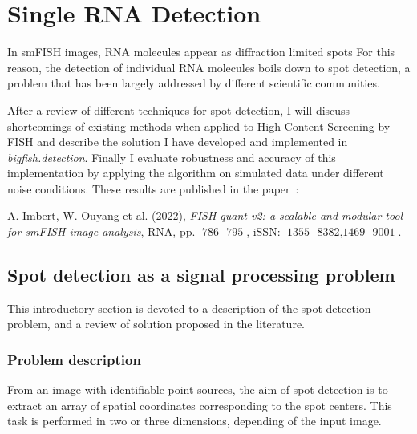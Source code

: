
\graphicspath{{./figures/chapter2/}}

\chapter{Single RNA Detection}
\label{ch:chapter2}


\newpage
\minitoc
\newpage

In \ac{smFISH} images, \ac{RNA} molecules appear as diffraction limited spots
For this reason, the detection of individual \ac{RNA} molecules boils down to spot detection, a problem that has been largely addressed by different scientific communities.

After a review of different techniques for spot detection, I will discuss shortcomings of existing methods when applied to High Content Screening by \ac{FISH} and describe the solution I have developed and implemented in \mbox{\emph{bigfish.detection}}.
Finally I evaluate robustness and accuracy of this implementation by applying the algorithm on simulated data under different noise conditions.
These results are published in the paper~\cite{Imbert_fq_2022}:

\begin{center}
	\color{green}
	A. Imbert, W. Ouyang et al. (2022), \textit{FISH-quant v2: a scalable and modular tool for smFISH image analysis}, RNA, pp. $\operatorname{786--795}$, iSSN: $\operatorname{1355--8382, 1469--9001}$.
\end{center}

\section{Spot detection as a signal processing problem}
\label{sec:detection_introduction}

This introductory section is devoted to a description of the spot detection problem, and a review of solution proposed in the literature.  

\subsection{Problem description}
\label{subsec:detection}

From an image with identifiable point sources, the aim of spot detection is to extract an array of spatial coordinates corresponding to the spot centers.
This task is performed in two or three dimensions, depending of the input image.\\

